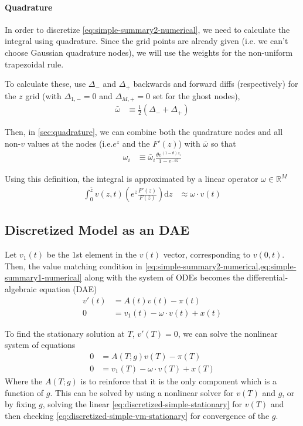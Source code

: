 \documentclass[11pt]{article}
\newcommand{\R}{\ensuremath{\mathbb{R}}}
\newcommand{\diff}{\ensuremath{\mathrm{d}}}
\begin{document}
\paragraph{Quadrature}
In order to discretize \cref{eq:simple-summary2-numerical}, we need to calculate the integral using quadrature.  Since the grid points are already given (i.e. we can't choose Gaussian quadrature nodes), we will use the weights for the non-uniform trapezoidal rule.

To calculate these, use $\Delta_{-}$ and $\Delta_{+}$ backwards and forward diffs (respectively) for the $z$ grid (with $\Delta_{1,-} = 0$ and $\Delta_{M,+} = 0$ set for the ghost nodes),
\begin{align}
\bar{\omega}&\equiv \frac1{2}(\Delta_{-} + \Delta_{+})
\end{align}

Then, in \cref{sec:quadrature}, we can combine both the quadrature nodes and all non-$v$ values at the nodes (i.e.$e^z$ and the $F'(z)$) with $\bar{\omega}$ so that
\begin{align}
\omega_i &\equiv \bar{\omega}_i \frac{\theta e^{(1 - \theta)z_i}}{1 - e^{-\theta \bar{z}}}
\end{align}

\noindent Using this definition, the integral is approximated by a linear operator $\omega\in\R^M$
\begin{align}
 \int_{0}^{\bar{z}}  v(z,t) \left(e^z \frac{F'(z)}{F(\bar{z})}\right) \diff z &\approx \omega \cdot v(t)
\end{align}

\subsection{Discretized Model as an DAE}
Let $v_1(t)$ be the $1$st element in the $v(t)$ vector, corresponding to $v(0,t)$.  Then, the value matching condition in \cref{eq:simple-summary2-numerical,eq:simple-summary1-numerical} along with the system of ODEs becomes the differential-algebraic equation (DAE)
\begin{align}
	v'(t) &= A(t) v(t) - \pi(t)\label{eq:discretized-simple}\\
	0 &= v_1(t) - \omega \cdot v(t) + x(t)\label{eq:discretized-simple-vm}
\end{align}


To find the stationary solution at $T$,  $v'(T) = 0$, we can solve the nonlinear system of equations
\begin{align}
	0 &= A(T; g) v(T) - \pi(T)\label{eq:discretized-simple-stationary}\\
	0 &= v_1(T) - \omega \cdot v(T) + x(T)\label{eq:discretized-simple-vm-stationary}
\end{align}
Where the $ A(T; g)$ is to reinforce that it is the only component which is a function of $g$.  This can be solved by using a nonlinear solver for $v(T)$ and $g$, or by fixing $g$, solving the linear \cref{eq:discretized-simple-stationary} for $v(T)$ and then checking \cref{eq:discretized-simple-vm-stationary} for convergence of the $g$.
\end{document}
